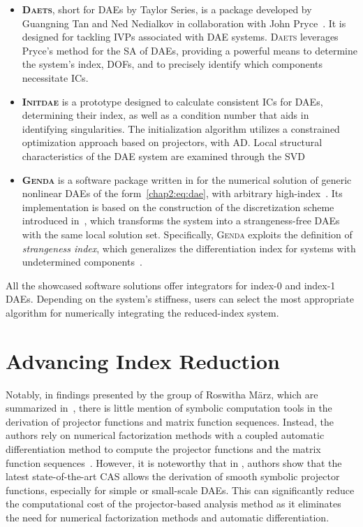 \begin{itemize}
  \item \textbf{\textsc{Daets}}, short for \acp{DAE} by Taylor Series, is a \cpp{} package developed by Guangning Tan and Ned Nedialkov in collaboration with John Pryce~\cite{nedialkov2007solvingI, nedialkov2007solvingII, nedialkov2008solvingIII}. It is designed for tackling \acp{IVP} associated with \ac{DAE} systems. \textsc{Daets} leverages Pryce's method for the \ac{SA} of \acp{DAE}, providing a powerful means to determine the system's index, \acp{DOF}, and to precisely identify which components necessitate \acp{IC}.
  \item \textbf{\textsc{Initdae}} is a \Python{} prototype designed to calculate consistent \acp{IC} for \acp{DAE}, determining their index, as well as a condition number that aids in identifying singularities. The initialization algorithm utilizes a constrained optimization approach based on projectors, with \ac{AD}. Local structural characteristics of the \ac{DAE} system are examined through the \ac{SVD}~\cite{estvezschwarz2021initdae}
  \item \textbf{\textsc{Genda}} is a software package written in \Fortran{} for the numerical solution of generic nonlinear \acp{DAE} of the form~\eqref{chap2:eq:dae}, with arbitrary high-index~\cite{kunkel2002genda}. Its implementation is based on the construction of the discretization scheme introduced in~\cite{kunkel1996new}, which transforms the system into a strangeness-free \acp{DAE} with the same local solution set. Specifically, \textsc{Genda} exploits the definition of \emph{strangeness index}, which generalizes the differentiation index for systems with undetermined components~\cite{kunkel2006differential}.
\end{itemize}
%
All the showcased software solutions offer integrators for index-0 and index-1 \acp{DAE}. Depending on the system's stiffness, users can select the most appropriate algorithm for numerically integrating the reduced-index system.


\section{Advancing Index Reduction}

Notably, in findings presented by the group of Roswitha M{\"a}rz, which are summarized in~\cite{lamour2013differential}, there is little mention of symbolic computation tools in the derivation of projector functions and matrix function sequences. Instead, the authors rely on numerical factorization methods with a coupled automatic differentiation method to compute the projector functions and the matrix function sequences~\cite{lamour2011computational, schwarz2015diagnosis}. However, it is noteworthy that in \citet{lamour2013differential}, authors show that the latest state-of-the-art \ac{CAS} allows the derivation of smooth symbolic projector functions, especially for simple or small-scale \acp{DAE}. This can significantly reduce the computational cost of the projector-based analysis method as it eliminates the need for numerical factorization methods and automatic differentiation.

